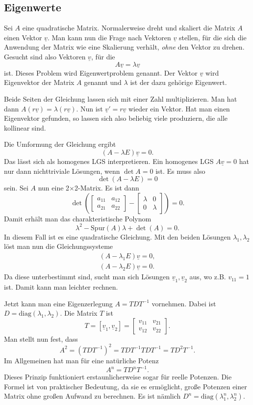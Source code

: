 \documentclass[a4paper,10pt,fleqn,twocolumn,twoside]{article}
\begin{document}
\subsection{Eigenwerte}

Sei \(A\) eine quadratische Matrix. Normalerweise dreht und skaliert
die Matrix \(A\) einen Vektor \(\underline v\). Man kann nun die Frage
nach Vektoren \(\underline v\) stellen, für die sich die Anwendung
der Matrix wie eine Skalierung verhält, \textit{ohne} den Vektor zu
drehen. Gesucht sind also Vektoren \(\underline v\), für die
\[A\underline v = \lambda\underline v\]
ist. Dieses Problem wird Eigenwertproblem genannt. Der Vektor
\(\underline v\) wird Eigenvektor der Matrix \(A\) genannt und
\(\lambda\) ist der dazu gehörige Eigenwert.

Beide Seiten der Gleichung lassen sich mit einer Zahl multiplizieren.
Man hat dann \(A(r\underline v)=\lambda(r\underline v)\).
Nun ist \(\underline v'=r\underline v\) wieder ein Vektor.
Hat man einen Eigenvektor gefunden, so lassen sich also beliebig
viele produziern, die alle kollinear sind.

Die Umformung der Gleichung ergibt
\[(A-\lambda E)\underline v=0.\]
Das lässt sich als homogenes LGS interpretieren. Ein homogenes LGS
\(A\underline v=0\) hat nur dann nichttriviale Lösungen,
wenn \(\det A=0\) ist. Es muss also
\[\det(A-\lambda E)=0\]
sein. Sei \(A\) nun eine 2\(\times\)2-Matrix. Es ist dann
\[\det\left(\begin{bmatrix}a_{11} & a_{12}\\
a_{21} & a_{22}\end{bmatrix}-
\begin{bmatrix}\lambda & 0\\
0 & \lambda\end{bmatrix}\right)=0.\]
Damit erhält man das charakteristische Polynom
\[\lambda^2 -\mathrm{Spur}(A)\lambda+\det(A)=0.\]
In diesem Fall ist es eine quadratische Gleichung.
Mit den beiden Lösungen \(\lambda_1,\lambda_2\) löst man nun
die Gleichungssysteme
\begin{gather*}
(A-\lambda_1 E)\underline v=0,\\
(A-\lambda_2 E)\underline v=0.
\end{gather*}
Da diese unterbestimmt sind, sucht man sich Lösungen
\(\underline v_1,\underline v_2\) aus, wo z.B. \(v_{11}=1\) ist.
Damit kann man leichter rechnen.

Jetzt kann man eine Eigenzerlegung \(A=TDT^{-1}\) vornehmen.
Dabei ist \(D=\mathrm{diag}(\lambda_1,\lambda_2)\).
Die Matrix \(T\) ist
\[T=[\underline v_1, \underline v_2]=\begin{bmatrix}
v_{11} & v_{21}\\
v_{12} & v_{22}
\end{bmatrix}.\]
Man stellt nun fest, dass
\[A^2 = (TDT^{-1})^2 = TDT^{-1}TDT^{-1} = TD^2T^{-1}.\]
Im Allgemeinen hat man für eine natürliche Potenz
\[A^n = TD^nT^{-1}.\]
Dieses Prinzip funktioniert erstaunlicherweise sogar für reelle
Potenzen. Die Formel ist von praktischer Bedeutung, da sie es
ermöglicht, große Potenzen einer Matrix ohne großen Aufwand zu
berechnen. Es ist nämlich
\(D^n=\mathrm{diag}(\lambda_1^n,\lambda_2^n)\).
\end{document}

